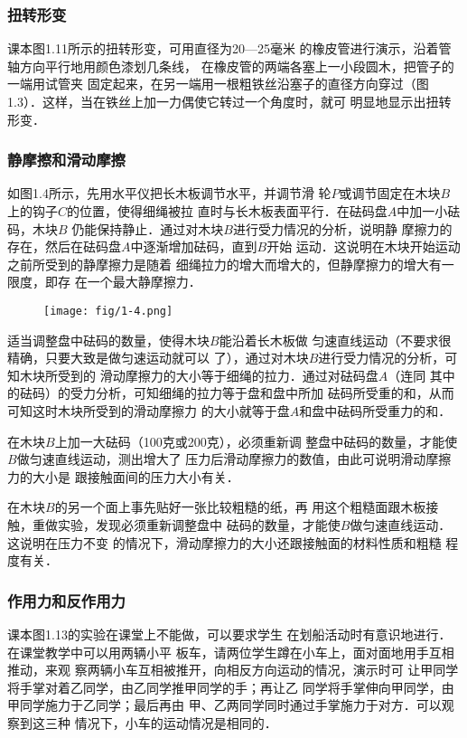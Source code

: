\subsubsection{扭转形变}
课本图1.11所示的扭转形变，可用直径为20—25毫米
的橡皮管进行演示，沿着管轴方向平行地用颜色漆划几条线，
在橡皮管的两端各塞上一小段圆木，把管子的一端用试管夹
固定起来，在另一端用一根粗铁丝沿塞子的直径方向穿过（图
1.3）．这样，当在铁丝上加一力偶使它转过一个角度时，就可
明显地显示出扭转形变．


\subsubsection{静摩擦和滑动摩擦}
如图1.4所示，先用水平仪把长木板调节水平，并调节滑
轮$P$或调节固定在木块$B$上的钩子$C$的位置，使得细绳被拉
直时与长木板表面平行．在砝码盘$A$中加一小砝码，木块$B$
仍能保持静止．通过对木块$B$进行受力情况的分析，说明静
摩擦力的存在，然后在砝码盘$A$中逐渐增加砝码，直到$B$开始
运动．这说明在木块开始运动之前所受到的静摩擦力是随着
细绳拉力的增大而增大的，但静摩擦力的增大有一限度，即存
在一个最大静摩擦力．
\begin{figure}[htp]
    \centering
    \texttt{[image: fig/1-4.png]}
    \caption{}
\end{figure}

适当调整盘中砝码的数量，使得木块$B$能沿着长木板做
匀速直线运动（不要求很精确，只要大致是做匀速运动就可以
了），通过对木块$B$进行受力情况的分析，可知木块所受到的
滑动摩擦力的大小等于细绳的拉力．通过对砝码盘$A$（连同
其中的砝码）的受力分析，可知细绳的拉力等于盘和盘中所加
砝码所受重的和，从而可知这时木块所受到的滑动摩擦力
的大小就等于盘$A$和盘中砝码所受重力的和．

在木块$B$上加一大砝码（100克或200克），必须重新调
整盘中砝码的数量，才能使$B$做匀速直线运动，测出增大了
压力后滑动摩擦力的数值，由此可说明滑动摩擦力的大小是
跟接触面间的压力大小有关．

在木块$B$的另一个面上事先贴好一张比较粗糙的纸，再
用这个粗糙面跟木板接触，重做实验，发现必须重新调整盘中
砝码的数量，才能使$B$做匀速直线运动．这说明在压力不变
的情况下，滑动摩擦力的大小还跟接触面的材料性质和粗糙
程度有关．

\subsubsection{作用力和反作用力}
课本图1.13的实验在课堂上不能做，可以要求学生
在划船活动时有意识地进行．在课堂教学中可以用两辆小平
板车，请两位学生蹲在小车上，面对面地用手互相推动，来观
察两辆小车互相被推开，向相反方向运动的情况，演示时可
让甲同学将手掌对着乙同学，由乙同学推甲同学的手；再让乙
同学将手掌伸向甲同学，由甲同学施力于乙同学；最后再由
甲、乙两同学同时通过手掌施力于对方．可以观察到这三种
情况下，小车的运动情况是相同的．

